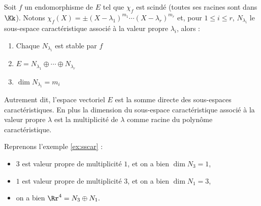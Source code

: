 \documentclass[12pt, class=report,crop=false]{standalone}
\begin{document}
\begin{theoreme}
Soit $f$ un endomorphisme de $E$ tel que $\chi_f$ est scindé (toutes ses racines sont dans $\Kk$).
Notons $\chi_f(X)=\pm(X-\lambda_1)^{m_1}\cdots(X-\lambda_r)^{m_r}$ et, pour $1\leq i\leq r$, $N_{\lambda_i}$ le sous-espace caractéristique associé à la
valeur propre $\lambda_i$, alors :

\begin{enumerate}
  \item Chaque $N_{\lambda_i}$ est stable par $f$
  \item $E=N_{\lambda_1}\oplus\cdots\oplus N_{\lambda_r}$
  \item $\dim N_{\lambda_i}=m_i$ 
\end{enumerate}
\end{theoreme} 

Autrement dit, l'espace vectoriel $E$ est la somme directe des sous-espaces caractéristiques. En plus la dimension du sous-espace caractéristique associé à la valeur propre $\lambda$ est la multiplicité de $\lambda$ comme racine du polynôme caractéristique. 

\begin{exemple}
Reprenons l'exemple \ref{ex:sscar} :
\begin{itemize}	
  \item $3$ est valeur propre de multiplicité $1$, et on a bien $\dim N_3 = 1$,
  \item $1$ est valeur propre de multiplicité $3$, et on a bien $\dim N_1 = 3$,
  \item on a bien $\Rr^4 = N_3 \oplus N_1.$
\end{itemize}
\end{exemple}
\end{document}
